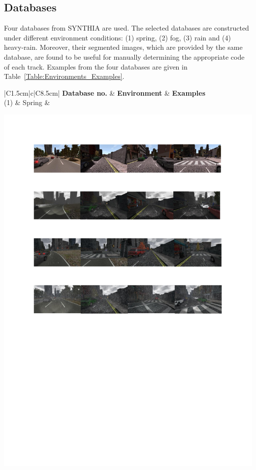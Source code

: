 \documentclass{svproc}
\begin{document}
	\subsection{Databases} 
	Four databases from SYNTHIA \cite{Ros2016TheSYNTHIA} are used. The selected databases are constructed under different environment conditions: (1) spring, (2) fog, (3) rain and (4) heavy-rain. Moreover, their segmented images, which are provided by the same database, are found to be useful for manually determining the appropriate code of each track. Examples from the four databases are given in Table~\ref{Table:Environments_Examples}.	
	\begin{table}[!t]
		\centering
		\caption{Examples of the four employed environments}
		\label{Table:Environments_Examples}
		\begin{tabular}{|C{1.5cm}|c|C{8.5cm}|}
			\hline
			\textbf{Database no.} & \textbf{Environment} & \textbf{Examples} \\ \hline
			(1)	& Spring & \begin{minipage}{.9\textwidth}\includegraphics[scale=.5,trim=2cm 24.5cm 2cm 2.5cm,clip]{examples.pdf}\end{minipage} \\ \hline

\end{tabular}
\end{table}
\end{document}

